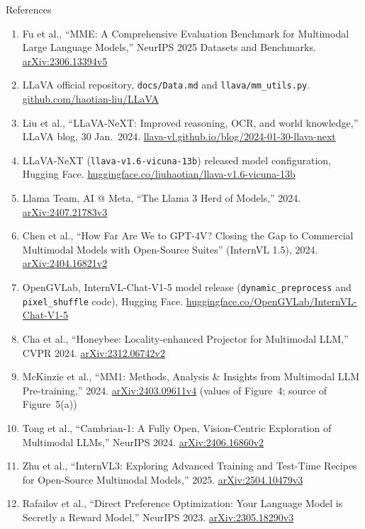 \begin{frame}[allowframebreaks]{References}
\begin{enumerate}
    \item Fu et al., ``MME: A Comprehensive Evaluation Benchmark for Multimodal Large Language Models,'' NeurIPS 2025 Datasets and Benchmarks. \href{https://arxiv.org/abs/2306.13394v5}{arXiv:2306.13394v5}
    \item LLaVA official repository, \texttt{docs/Data.md} and \texttt{llava/mm\_utils.py}. \href{https://github.com/haotian-liu/LLaVA}{github.com/haotian-liu/LLaVA}
    \item Liu et al., ``LLaVA-NeXT: Improved reasoning, OCR, and world knowledge,'' LLaVA blog, 30 Jan.\ 2024. \href{https://llava-vl.github.io/blog/2024-01-30-llava-next/}{llava-vl.github.io/blog/2024-01-30-llava-next}
    \item LLaVA-NeXT (\texttt{llava-v1.6-vicuna-13b}) released model configuration, Hugging Face. \href{https://huggingface.co/liuhaotian/llava-v1.6-vicuna-13b/blob/main/config.json}{huggingface.co/liuhaotian/llava-v1.6-vicuna-13b}
    \item Llama Team, AI @ Meta, ``The Llama 3 Herd of Models,'' 2024. \href{https://arxiv.org/abs/2407.21783v3}{arXiv:2407.21783v3}
    \item Chen et al., ``How Far Are We to GPT-4V? Closing the Gap to Commercial Multimodal Models with Open-Source Suites'' (InternVL 1.5), 2024. \href{https://arxiv.org/abs/2404.16821v2}{arXiv:2404.16821v2}
    \item OpenGVLab, InternVL-Chat-V1-5 model release (\texttt{dynamic\_preprocess} and \texttt{pixel\_shuffle} code), Hugging Face. \href{https://huggingface.co/OpenGVLab/InternVL-Chat-V1-5}{huggingface.co/OpenGVLab/InternVL-Chat-V1-5}
    \item Cha et al., ``Honeybee: Locality-enhanced Projector for Multimodal LLM,'' CVPR 2024. \href{https://arxiv.org/abs/2312.06742v2}{arXiv:2312.06742v2}
    \item McKinzie et al., ``MM1: Methods, Analysis \& Insights from Multimodal LLM Pre-training,'' 2024. \href{https://arxiv.org/abs/2403.09611v4}{arXiv:2403.09611v4} (values of Figure~4; source of Figure~5(a))
    \item Tong et al., ``Cambrian-1: A Fully Open, Vision-Centric Exploration of Multimodal LLMs,'' NeurIPS 2024. \href{https://arxiv.org/abs/2406.16860v2}{arXiv:2406.16860v2}
    \item Zhu et al., ``InternVL3: Exploring Advanced Training and Test-Time Recipes for Open-Source Multimodal Models,'' 2025. \href{https://arxiv.org/abs/2504.10479v3}{arXiv:2504.10479v3}
    \item Rafailov et al., ``Direct Preference Optimization: Your Language Model is Secretly a Reward Model,'' NeurIPS 2023. \href{https://arxiv.org/abs/2305.18290v3}{arXiv:2305.18290v3}

\end{enumerate}
\end{frame}
